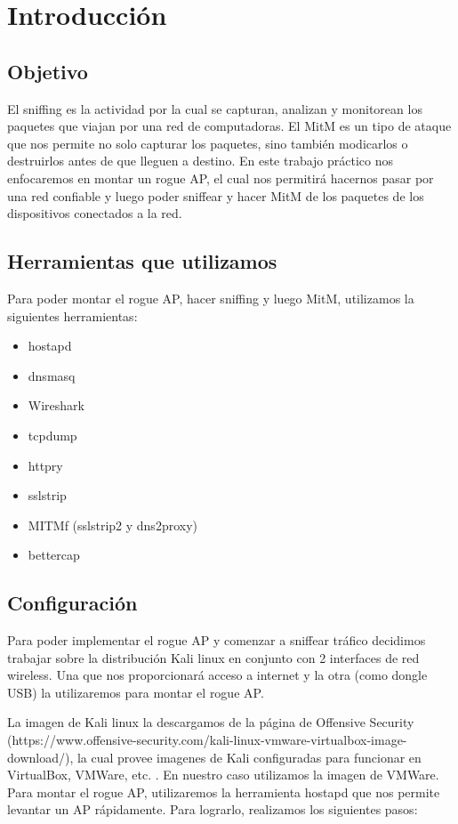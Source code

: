 \section{Introducción}

\subsection{Objetivo}
El sniffing es la actividad por la cual se capturan, analizan y monitorean los paquetes que viajan por una red de computadoras. El MitM es un tipo de ataque
que nos permite no solo capturar los paquetes, sino también modicarlos o destruirlos antes de que lleguen a destino. En este trabajo práctico nos enfocaremos 
en montar un rogue AP, el cual nos permitirá hacernos pasar por una red confiable y luego poder sniffear y hacer MitM de los paquetes de los dispositivos 
conectados a la red.

\subsection{Herramientas que utilizamos}

Para poder montar el rogue AP, hacer sniffing y luego MitM, utilizamos la siguientes herramientas:

\begin{itemize}
	\item hostapd
	\item dnsmasq
	\item Wireshark
	\item tcpdump
	\item httpry
	\item sslstrip
	\item MITMf (sslstrip2 y dns2proxy)
	\item bettercap
\end{itemize}

\subsection{Configuración}
Para poder implementar el rogue AP y comenzar a sniffear tráfico decidimos trabajar sobre la distribución Kali linux en conjunto con 2 interfaces de red wireless. 
Una que nos proporcionará acceso a internet y la otra (como dongle USB) la utilizaremos para montar el rogue AP. 

La imagen de Kali linux la descargamos de la página de Offensive Security (https://www.offensive-security.com/kali-linux-vmware-virtualbox-image-download/), 
la cual provee imagenes de Kali configuradas para funcionar en VirtualBox, VMWare, etc. . En nuestro caso utilizamos la imagen de VMWare. Para montar el rogue AP, 
utilizaremos la herramienta hostapd que nos permite levantar un AP rápidamente. Para lograrlo, realizamos los siguientes pasos:

